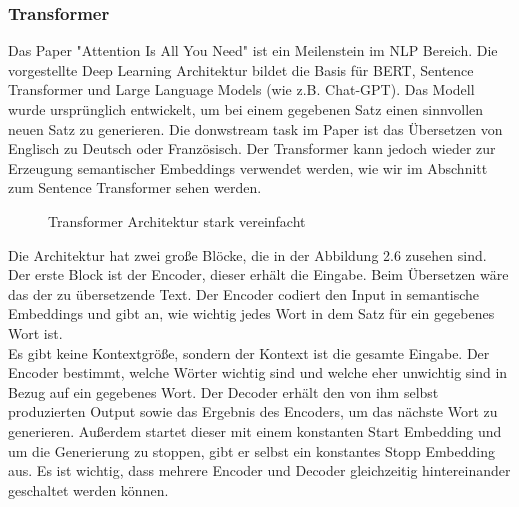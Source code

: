 \documentclass[12pt,letterpaper,ngerman]{article}
\begin{document}
\subsubsection{Transformer}
Das Paper "Attention Is All You Need" \cite{vaswani2023attentionneed}
ist ein Meilenstein im NLP Bereich.
Die vorgestellte Deep Learning Architektur bildet die Basis für BERT,
Sentence Transformer und Large Language Models (wie z.B. Chat-GPT).
Das Modell wurde ursprünglich entwickelt, um bei einem gegebenen Satz 
einen sinnvollen neuen Satz zu generieren. Die donwstream task im Paper 
ist das Übersetzen von Englisch zu Deutsch oder Französisch. 
Der Transformer kann jedoch wieder zur Erzeugung semantischer Embeddings 
verwendet werden, wie wir im Abschnitt zum Sentence Transformer sehen 
werden.
\begin{figure}[H]
  \begin{center}
  \end{center}
  \caption{Transformer Architektur stark vereinfacht}
\end{figure}
Die Architektur hat zwei große Blöcke, die in der Abbildung 2.6 zusehen
sind. Der erste Block ist der Encoder, dieser erhält die Eingabe.
Beim Übersetzen wäre das der zu übersetzende Text.
Der Encoder codiert den Input in semantische Embeddings und gibt an,
wie wichtig jedes Wort in dem Satz für ein gegebenes Wort ist.\\
Es gibt keine Kontextgröße, sondern der Kontext ist die gesamte
Eingabe.
Der Encoder bestimmt, welche Wörter wichtig sind und welche eher 
unwichtig sind in Bezug auf ein gegebenes Wort.
Der Decoder erhält den von ihm selbst produzierten Output sowie 
das Ergebnis des Encoders, um das nächste Wort zu generieren. 
Außerdem startet dieser mit einem konstanten Start Embedding und 
um die Generierung zu stoppen, gibt er selbst ein konstantes Stopp 
Embedding aus. Es ist wichtig, dass mehrere Encoder und Decoder 
gleichzeitig hintereinander geschaltet werden können.\\
\end{document}
